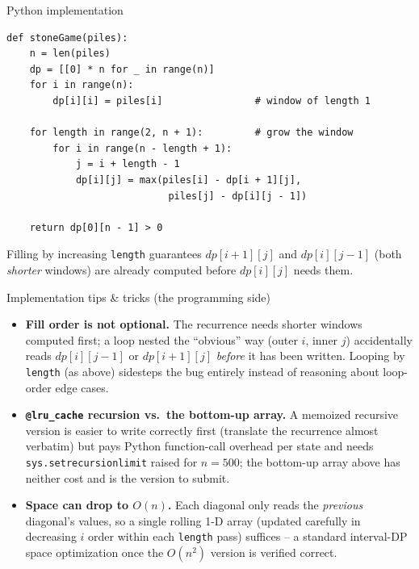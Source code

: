 \documentclass[11pt,aspectratio=169]{beamer}
\begin{document}
\begin{frame}[fragile]{Python implementation}
  \begin{lstlisting}[style=py]
def stoneGame(piles):
    n = len(piles)
    dp = [[0] * n for _ in range(n)]
    for i in range(n):
        dp[i][i] = piles[i]                # window of length 1

    for length in range(2, n + 1):         # grow the window
        for i in range(n - length + 1):
            j = i + length - 1
            dp[i][j] = max(piles[i] - dp[i + 1][j],
                            piles[j] - dp[i][j - 1])

    return dp[0][n - 1] > 0
  \end{lstlisting}
  \vspace{0.3em}
  \small Filling by increasing \texttt{length} guarantees $dp[i{+}1][j]$ and
  $dp[i][j{-}1]$ (both \emph{shorter} windows) are already computed before $dp[i][j]$
  needs them.
\end{frame}

\begin{frame}{Implementation tips \& tricks (the programming side)}
  \small
  \begin{itemize}
    \item \textbf{Fill order is not optional.} The recurrence needs shorter windows
    computed first; a loop nested the ``obvious'' way (outer $i$, inner $j$) accidentally
    reads $dp[i][j-1]$ or $dp[i+1][j]$ \emph{before} it has been written. Looping by
    \texttt{length} (as above) sidesteps the bug entirely instead of reasoning about
    loop-order edge cases.
    \item \textbf{\texttt{@lru\_cache} recursion vs.\ the bottom-up array.} A memoized
    recursive version is easier to write correctly first (translate the recurrence
    almost verbatim) but pays Python function-call overhead per state and needs
    \texttt{sys.setrecursionlimit} raised for $n=500$; the bottom-up array above has
    neither cost and is the version to submit.
    \item \textbf{Space can drop to $O(n)$.} Each diagonal only reads the
    \emph{previous} diagonal's values, so a single rolling 1-D array (updated carefully
    in decreasing $i$ order within each \texttt{length} pass) suffices -- a standard
    interval-DP space optimization once the $O(n^2)$ version is verified correct.
  \end{itemize}
\end{frame}

\end{document}
